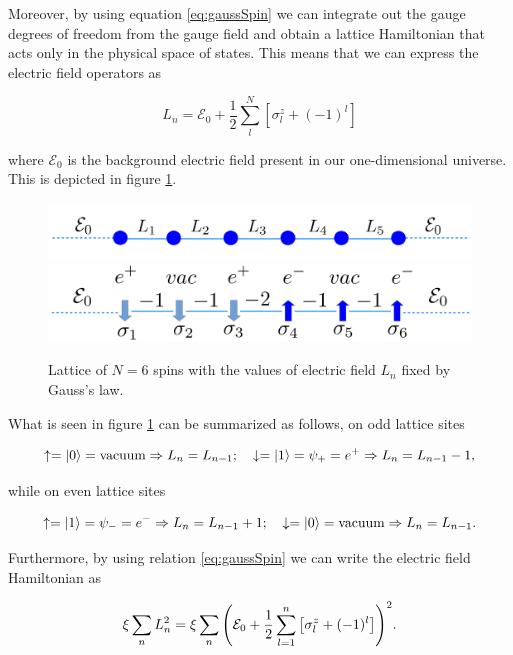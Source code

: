 Moreover, by using equation \eqref{eq:gaussSpin} we can integrate out the gauge degrees of freedom from the gauge field and obtain a lattice Hamiltonian that acts only in the physical space of states. This means that we can express the electric field operators as

\begin{equation}
L_n  = \mathcal{E}_0 + \frac{1}{2}\sum_l^N[\sigma^z_l + (-1)^l]
\end{equation}

where $\mathcal{E}_0$ is the background electric field present in our one-dimensional universe. This is depicted in figure \ref{fig:l5}.

\begin{figure}[htb]
	\centering
	\includegraphics[scale=0.28]{figures/latice4.png}
	\centering
	\includegraphics[scale=0.28]{figures/latice5.png}
	\caption{Lattice of $N=6$ spins with the values of electric field $L_n$ fixed by Gauss's law.} \label{fig:l5}
\end{figure}

What is seen in figure \ref{fig:l5} can be summarized as follows, on odd lattice sites

\begin{equation*}
	\uparrow =\ket{0}= \text{vacuum}\Rightarrow L_n = L_{n-1};\quad \downarrow = \ket{1} = \psi_+ = e^+\Rightarrow L_n = L_{n-1} -1,
\end{equation*}

while on even lattice sites

\begin{equation*}
	\uparrow = \ket{1} = \psi_- = e^-\Rightarrow L_n = L_{n-1}+1;\quad \downarrow = \ket{0} = \text{vacuum}\Rightarrow L_n = L_{n-1}.
\end{equation*}

Furthermore, by using relation \eqref{eq:gaussSpin} we can write the electric field Hamiltonian as

\begin{equation}
\xi\sum_n L_n^2 = \xi\sum_n \qty(\mathcal{E}_0 + \frac{1}{2}\sum_{l=1}^{n}\qty[\sigma^z_l + (-1)^l])^2.
\end{equation}

